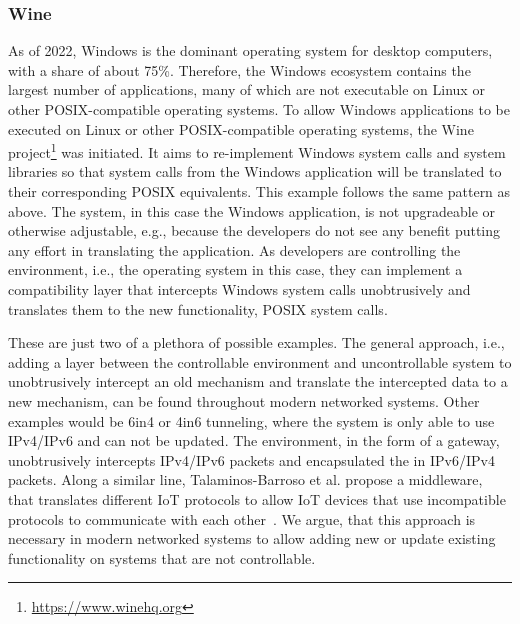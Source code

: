\subsubsection{Wine}
As of 2022, Windows is the dominant operating system for desktop computers, with a share of about 75\%.
Therefore, the Windows ecosystem contains the largest number of applications, many of which are not executable on Linux or other POSIX-compatible operating systems.
To allow Windows applications to be executed on Linux or other POSIX-compatible operating systems, the Wine project\footnote{\url{https://www.winehq.org}} was initiated.
It aims to re-implement Windows system calls and system libraries so that system calls from the Windows application will be translated to their corresponding POSIX equivalents.
This example follows the same pattern as above.
The system, in this case the Windows application, is not upgradeable or otherwise adjustable, e.g., because the developers do not see any benefit putting any effort in translating the application.
As developers are controlling the environment, i.e., the operating system in this case, they can implement a compatibility layer that intercepts Windows system calls unobtrusively and translates them to the new functionality, POSIX system calls.

These are just two of a plethora of possible examples.
The general approach, i.e., adding a layer between the controllable environment and uncontrollable system to unobtrusively intercept an old mechanism and translate the intercepted data to a new mechanism, can be found throughout modern networked systems.
Other examples would be 6in4 or 4in6 tunneling, where the system is only able to use IPv4/IPv6 and can not be updated.
The environment, in the form of a gateway, unobtrusively intercepts IPv4/IPv6 packets and encapsulated the in IPv6/IPv4 packets.
Along a similar line, Talaminos-Barroso et al. propose a middleware, that translates different IoT protocols to allow IoT devices that use incompatible protocols to communicate with each other~\cite{talaminos2022interceptor}.
We argue, that this approach is necessary in modern networked systems to allow adding new or update existing functionality on systems that are not controllable.

